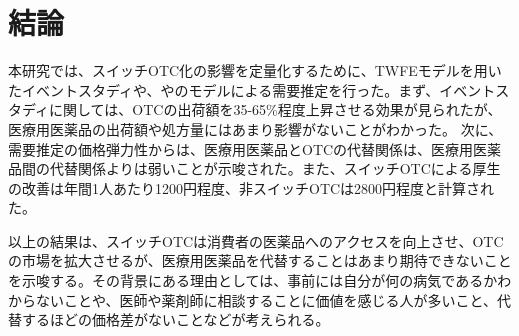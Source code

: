 \documentclass[a4paper,11pt,uplatex]{jsarticle}
\theoremstyle{definition}
\begin{document}
\section{結論}
本研究では、スイッチOTC化の影響を定量化するために、TWFEモデルを用いたイベントスタディや、\cite{Berry1994}や\cite{BLP}のモデルによる需要推定を行った。まず、イベントスタディに関しては、OTCの出荷額を35-65\%程度上昇させる効果が見られたが、医療用医薬品の出荷額や処方量にはあまり影響がないことがわかった。
次に、需要推定の価格弾力性からは、医療用医薬品とOTCの代替関係は、医療用医薬品間の代替関係よりは弱いことが示唆された。また、スイッチOTCによる厚生の改善は年間1人あたり1200円程度、非スイッチOTCは2800円程度と計算された。

以上の結果は、スイッチOTCは消費者の医薬品へのアクセスを向上させ、OTCの市場を拡大させるが、医療用医薬品を代替することはあまり期待できないことを示唆する。その背景にある理由としては、事前には自分が何の病気であるかわからないことや、医師や薬剤師に相談することに価値を感じる人が多いこと、代替するほどの価格差がないことなどが考えられる。
\end{document}
